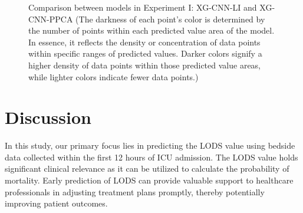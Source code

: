 \documentclass[12pt,a4paper,english
]{tunithesis}
\begin{document}
\begin{figure}
\begin{center}
    \qquad                        
      
    \caption[Results comparison in Experiment I]{Comparison between models in Experiment I: XG-CNN-LI and XG-CNN-PPCA (The darkness of each point's color is determined by the number of points within each predicted value area of the model. In essence, it reflects the density or concentration of data points within specific ranges of predicted values. Darker colors signify a higher density of data points within those predicted value areas, while lighter colors indicate fewer data points.)}
    \label{fig:experiment_2_result}
  \end{center}
\end{figure}

\chapter{Discussion}
\label{ch:discussion}

In this study, our primary focus lies in predicting the LODS value using bedside data collected within the first 12 hours of ICU admission. The LODS value holds significant clinical relevance as it can be utilized to calculate the probability of mortality. Early prediction of LODS can provide valuable support to healthcare professionals in adjusting treatment plans promptly, thereby potentially improving patient outcomes.
\end{document}
